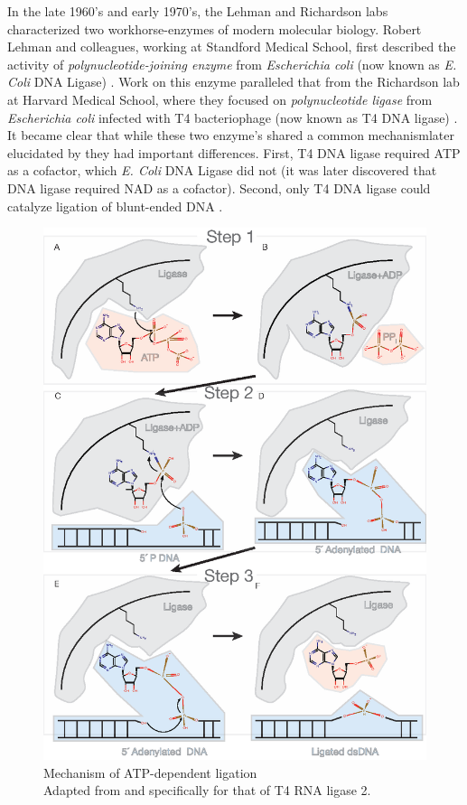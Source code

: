     In the late 1960's and early 1970's, the Lehman and Richardson labs characterized two workhorse-enzymes of modern molecular biology. Robert Lehman and colleagues, working at Standford Medical School, first described the activity of \textit{polynucleotide-joining enzyme} from \textit{Escherichia coli} (now known as \textit{E. Coli} DNA Ligase) \citep{Olivera1967b}. Work on this enzyme paralleled that from the Richardson lab at Harvard Medical School, where they focused on \textit{polynucleotide ligase} from \textit{Escherichia coli} infected with T4 bacteriophage (now known as T4 DNA ligase) \citep{Weiss1967a}. It became clear that while these two enzyme's shared a common mechanism\textemdash later elucidated by \citep{Modrich1973a}\textemdash they had important differences. First, T4 DNA ligase required ATP as a cofactor, which \textit{E. Coli} DNA Ligase did not (it was later discovered that DNA ligase required NAD as a cofactor). Second, only T4 DNA ligase could catalyze ligation of blunt-ended DNA \citep{Tabor1987a}.

    \begin{figure}%
      \centering 
      \includegraphics{Figures/Intro/LigationMechanism.eps}
      \caption[Mechanism of Rnl2 ATP-dependent ligation]
      {
        Mechanism of ATP-dependent ligation\\[0.25cm]
        Adapted from \citep{Nandakumar2006} and specifically for that of T4 RNA ligase 2.
        }
      \label{Intro:fig:Ligation Mechanism}
      \end{figure}

